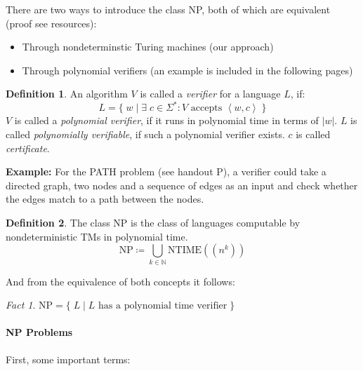 \documentclass[10pt,fleqn]{article}
\theoremstyle{definition}
\newtheorem{definition}{Definition}
\theoremstyle{remark}
\newtheorem{fact}{Fact}
\newcommand{\npclass}{\text{NP}}
\newcommand{\lpp}{\left \langle}
\newcommand{\rpp}{\right \rangle}
\newcommand{\enc}[1]{\lpp #1 \rpp}
\begin{document}
There are two ways to introduce the class NP, both of which are equivalent (proof see resources):
\begin{itemize}
    \item Through nondeterminstic Turing machines (our approach)
    \item Through polynomial verifiers (an example is included in the following pages)
\end{itemize}
\begin{definition} An algorithm \(V\) is called a \emph{verifier} for a language \(L\), if:
    \[
        L = \{\; w \mid \exists \; c \in \Sigma^*\colon V \text{ accepts } \enc{w, c} \; \}
    \]
    \(V\) is called a \emph{polynomial verifier}, if it runs in polynomial time in terms of \(|w|\). \(L\) is called \emph{polynomially verifiable}, if such a polynomial verifier exists. \(c\) is called \emph{certificate}.
\end{definition}
\textbf{Example:} For the PATH problem (see handout P), a verifier could take a directed graph, two nodes and a sequence of edges as an input and check whether the edges match to a path between the nodes.
\begin{definition} The class NP is the class of languages computable by nondeterministic TMs in polynomial time.
    \[
        \npclass \coloneqq \bigcup_{k \in \mathbb{N}} \text{NTIME}((n^k))
    \]
\end{definition}
And from the equivalence of both concepts it follows:
\begin{fact}
\(
    \npclass = \{\; L \mid L \text{ has a polynomial time verifier}\;\}
\)
\end{fact}
\begin{minipage}{\linewidth}
    \centering
\end{minipage}

\newpage

\paragraph*{NP Problems} First, some important terms:\\
\end{document}
